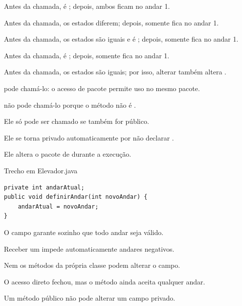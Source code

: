 \documentclass[11pt,a4paper]{article}
\begin{document}
\begin{minipage}[t]{.485\textwidth}
\begin{alternativas}
\item Antes da chamada,  é ; depois, ambos ficam no andar 1.
\item Antes da chamada, os estados diferem; depois, somente  fica no andar 1.
\item Antes da chamada, os estados são iguais e  é ; depois, somente  fica no andar 1.
\item Antes da chamada,  é ; depois, somente  fica no andar 1.
\item Antes da chamada, os estados são iguais; por isso, alterar  também altera .
\end{alternativas}
\begin{alternativas}
\item {} pode chamá-lo: o acesso de pacote permite uso no mesmo pacote.
\item {} não pode chamá-lo porque o método não é .
\item Ele só pode ser chamado se  também for público.
\item Ele se torna privado automaticamente por não declarar .
\item Ele altera o pacote de  durante a execução.
\end{alternativas}
\begin{painelEvolucao}{Trecho em Elevador.java}
\begin{lstlisting}[style=cenariocodigo]
private int andarAtual;
public void definirAndar(int novoAndar) {
    andarAtual = novoAndar;
}
\end{lstlisting}
\end{painelEvolucao}
\begin{alternativas}
\item O campo  garante sozinho que todo andar seja válido.
\item Receber um  impede automaticamente andares negativos.
\item Nem os métodos da própria classe podem alterar o campo.
\item O acesso direto fechou, mas o método ainda aceita qualquer andar.
\item Um método público não pode alterar um campo privado.
\end{alternativas}
\end{minipage}
\end{document}
